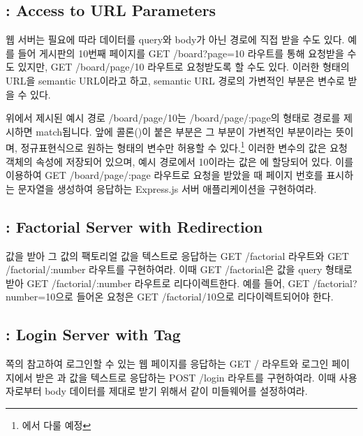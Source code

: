 \subsection*{: Access to URL Parameters}

웹 서버는 필요에 따라 데이터를 query와 body가 아닌 경로에 직접 받을 수도 있다. 예를 들어 게시판의 10번째 페이지를 GET /board?page=10 라우트를 통해 요청받을 수도 있지만, GET /board/page/10 라우트로 요청받도록 할 수도 있다. 이러한 형태의 URL을 semantic URL이라고 하고, semantic URL 경로의 가변적인 부분은 변수로 받을 수 있다.

위에서 제시된 예시 경로 /board/page/10는 /board/page/:page의 형태로 경로를 제시하면 match됩니다. 앞에 콜론(\cd{:})이 붙은 부분은 그 부분이 가변적인 부분이라는 뜻이며, 정규표현식으로 원하는 형태의 변수만 허용할 수 있다.\footnote{에서 다룰 예정} 이러한 변수의 값은 요청 객체의  속성에 저장되어 있으며, 예시 경로에서 10이라는 값은 에 할당되어 있다. 이를 이용하여 GET /board/page/:page 라우트로 요청을 받았을 때 페이지 번호를 표시하는 문자열을 생성하여 응답하는 Express.js 서버 애플리케이션을 구현하여라.


\subsection*{: Factorial Server with Redirection}

 값을 받아 그 값의 팩토리얼 값을 텍스트로 응답하는 GET /factorial 라우트와 GET /factorial/:number 라우트를 구현하여라. 이때 GET /factorial은  값을 query 형태로 받아 GET /factorial/:number 라우트로 리다이렉트한다. 예를 들어, GET /factorial?number=10으로 들어온 요청은 GET /factorial/10으로 리다이렉트되어야 한다.

\subsection*{: Login Server with  Tag}

\pageref{code:form-tag}쪽의 \를 참고하여 로그인할 수 있는 웹 페이지를 응답하는 GET / 라우트와 로그인 페이지에서 받은 과  값을 텍스트로 응답하는 POST /login 라우트를 구현하여라. 이때 사용자로부터 body 데이터를 제대로 받기 위해서 \와 같이 미들웨어를 설정하여라.
